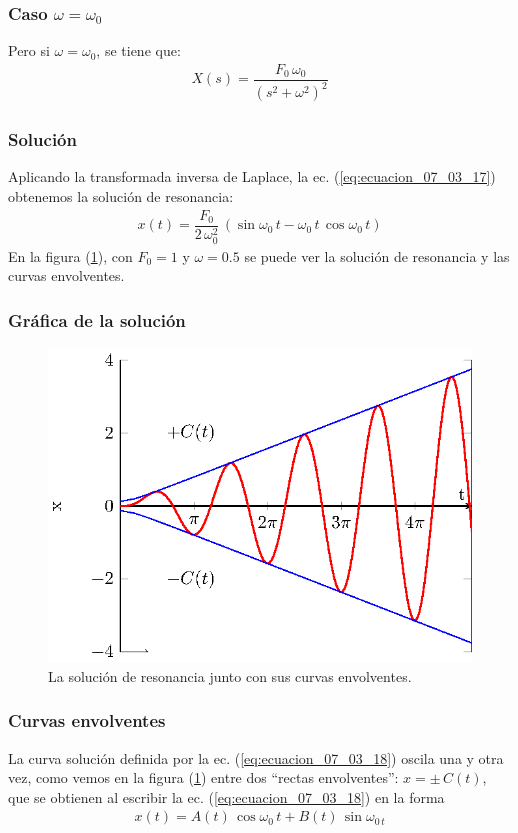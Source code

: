 \begin{frame}
\frametitle{Caso $\omega = \omega_{0}$}
Pero si $\omega = \omega_{0}$, se tiene que:
\pause
\begin{align*}
X(s) = \dfrac{F_{0} \, \omega_{0}}{(s^{2} + \omega^{2})^{2}}
\end{align*}
\end{frame}
\begin{frame}
\frametitle{Solución}
Aplicando la transformada inversa de Laplace, la ec. (\ref{eq:ecuacion_07_03_17}) obtenemos la solución de resonancia:
\pause
\begin{align}
x(t) = \dfrac{F_{0}}{2 \, \omega_{0}^{2}} \, (\sin \omega_{0} \, t - \omega_{0} \, t \, \cos \omega_{0} \, t )
\label{eq:ecuacion_07_03_18}
\end{align}
\pause
En la figura (\ref{fig_figura_07_03_04}), con $F_{0}=1$ y $\omega=0.5$ se puede ver la solución de resonancia y las curvas envolventes.
\end{frame}
\begin{frame}
\frametitle{Gráfica de la solución}
\begin{figure}[H]
    \centering
    \includegraphics[scale=0.95]{Imagenes/sist_masa_resorte_resonancia_plot_01.eps}
    \caption{La solución de resonancia junto con sus curvas envolventes.}
    \label{fig_figura_07_03_04}
\end{figure}
\end{frame}
\begin{frame}
\frametitle{Curvas envolventes}
La curva solución definida por la ec. (\ref{eq:ecuacion_07_03_18}) oscila una y otra vez, como vemos en la figura (\ref{fig_figura_07_03_04}) entre dos \enquote{rectas envolventes}: $x = \pm \, C(t)$, que se obtienen al escribir la ec. (\ref{eq:ecuacion_07_03_18}) en la forma
\begin{align*}
x(t) =  A(t) \, \cos \omega_{0} \, t +  B(t) \, \sin \omega_{0 \, t}
\end{align*}
\end{frame}
